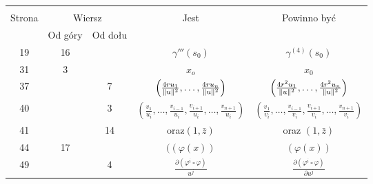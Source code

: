 \documentclass[a4paper,11pt]{article}
\begin{document}
\newpage


\vspace{-0.5em}


\begin{center}

  \begin{tabular}{|c|c|c|c|c|}
    \hline
    & \multicolumn{2}{c|}{} & & \\
    Strona & \multicolumn{2}{c|}{Wiersz} & Jest
                              & Powinno być \\ \cline{2-3}
    & Od góry & Od dołu & & \\
    \hline
    19  & 16 & & $\gamma'''( s_{ 0 } )$ & $\gamma^{ (4) }( s_{ 0 } )$ \\
    31  &  3 & & $x_{ o }$ & $x_{ 0 }$ \\
    37  & & 7 & $\left( \frac{ 4 r u_{ 1 } }{ \lVert{  u  }\rVert^{ 2 } }, \ldots,
                \frac{ 4 r u_{ n } }{ \lVert{  u  }\rVert^{ 2 } } \right)$
           & $\left( \frac{ 4 r^{ 2 } u_{ 1 } }{ \lVert{  u  }\rVert^{ 2 } },
             \ldots, \frac{ 4 r^{ 2 } u_{ n } }{ \lVert{  u  }\rVert^{ 2 } }
             \right)$ \\
    40  & &  3 & $( \frac { v_{ 1 } }{ u_{ i } }, \ldots,
                 \frac{ v_{ i - 1 } }{ u_{ i } },
                 \frac{ v_{ i + 1 } }{ u_{ i } }, \ldots,
                 \frac{ v_{ n + 1 } }{ u_{ i } } )$
           & $( \frac{ v_{ 1 } }{ v_{ i } }, \ldots,
             \frac{ v_{ i - 1 } }{ v_{ i } },
             \frac{ v_{ i + 1 } }{ v_{ i } }, \ldots,
             \frac{ v_{ n + 1 } }{ v_{ i } } )$ \\
    41  & & 14 & oraz$( 1, \bar{ z } )$ & oraz $( 1, \bar{ z } )$ \\
    44  & 17 & & $( ( \varphi( x ) )$ & $( \varphi( x ) )$ \\
    49  & &  4 & $\frac{ \partial ( \varphi^{ i } \circ \varphi ) }{ u^{ j } }$
           & $\frac{ \partial ( \varphi^{ i } \circ \varphi ) }{ \partial u^{ j } }$ \\
    \hline
  \end{tabular}

\end{center}

\vspace{\spaceTwo}
\end{document}
